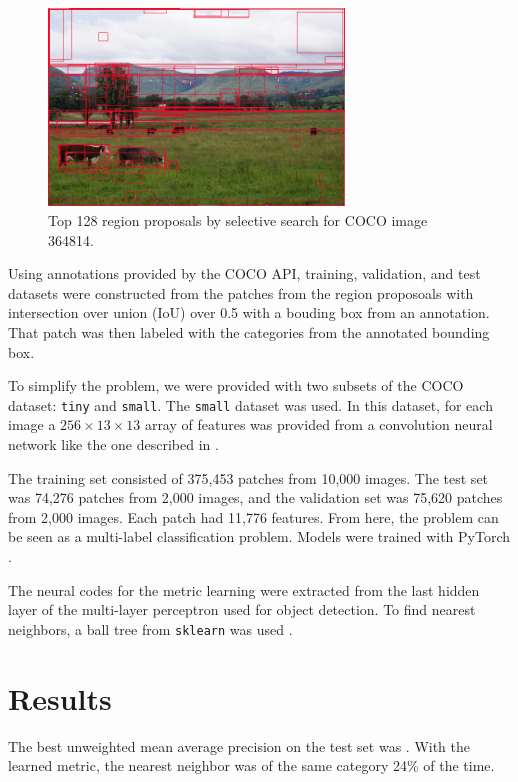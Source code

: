 \documentclass[letterpaper]{article}
\begin{document}
\begin{figure}
  \centering
  \includegraphics[width=0.7\textwidth]{../hw3/bounding_box_sample.png}
  \caption{Top 128 region proposals by selective search for COCO image 364814.}
  \label{fig:coco_selective_search}
\end{figure}

Using annotations provided by the COCO API, training, validation, and test
datasets were constructed from the patches from the region proposoals with
intersection over union (IoU) over 0.5 with a bouding box from an
annotation. That patch was then labeled with the categories from the annotated
bounding box.

To simplify the problem, we were provided with two subsets of the COCO dataset:
\texttt{tiny} and \texttt{small}. The \texttt{small} dataset was used. In this
dataset, for each image a $256 \times 13 \times 13$ array of features was
provided from a convolution neural network like the one described in
\cite{fast_rnn}.

The training set consisted of 375,453 patches from 10,000 images. The test set
was 74,276 patches from 2,000 images, and the validation set was 75,620 patches
from 2,000 images. Each patch had 11,776 features. From here, the problem can be
seen as a multi-label classification problem. Models were trained with PyTorch
\citep{pytorch}.

The neural codes for the metric learning were extracted from the last hidden
layer of the multi-layer perceptron used for object detection. To find nearest
neighbors, a ball tree from \texttt{sklearn} was used \citep{scikit-learn}.

\section{Results}

The best unweighted mean average precision on the test set was
\unskip. With the
learned metric, the nearest neighbor was of the same category 24\% of the
time.
\end{document}
